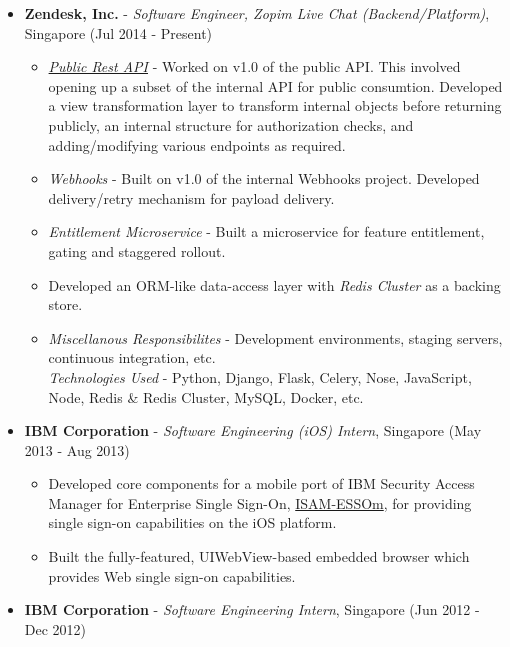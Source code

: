 \begin{itemize}
\tightlist
\item
  \textbf{Zendesk, Inc.} - \emph{Software Engineer, Zopim Live Chat
  (Backend/Platform)}, Singapore \hfill (Jul 2014 - Present)

  \begin{itemize}
  \tightlist
  \item
    \emph{\href{https://developer.zendesk.com/rest_api/docs/zopim/introduction}{Public
    Rest API}} - Worked on v1.0 of the public API. This involved opening
    up a subset of the internal API for public consumtion. Developed a
    view transformation layer to transform internal objects before
    returning publicly, an internal structure for authorization checks,
    and adding/modifying various endpoints as required.
  \item
    \emph{Webhooks} - Built on v1.0 of the internal Webhooks project.
    Developed delivery/retry mechanism for payload delivery.
  \item
    \emph{Entitlement Microservice} - Built a microservice for feature
    entitlement, gating and staggered rollout.
  \item
    Developed an ORM-like data-access layer with \emph{Redis Cluster} as
    a backing store.
  \item
    \emph{Miscellanous Responsibilites} - Development environments,
    staging servers, continuous integration, etc.\\
    \emph{Technologies Used} - Python, Django, Flask, Celery, Nose,
    JavaScript, Node, Redis \& Redis Cluster, MySQL, Docker, etc.
  \end{itemize}
\item
  \textbf{IBM Corporation} - \emph{Software Engineering (iOS) Intern},
  Singapore \hfill (May 2013 - Aug 2013)

  \begin{itemize}
  \tightlist
  \item
    Developed core components for a mobile port of IBM Security Access
    Manager for Enterprise Single Sign-On,
    \href{https://itunes.apple.com/us/app/isam-essom/id741972716?mt=8}{ISAM-ESSOm},
    for providing single sign-on capabilities on the iOS platform.
  \item
    Built the fully-featured, UIWebView-based embedded browser which
    provides Web single sign-on capabilities.
  \end{itemize}
\item
  \textbf{IBM Corporation} - \emph{Software Engineering Intern},
  Singapore \hfill (Jun 2012 - Dec 2012)


\end{itemize}
